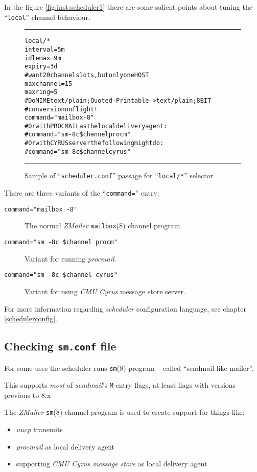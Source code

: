 In the figure \vref{fig:inst:scheduler1} there are some salient
points about tuning the ``{\tt local}'' channel behaviour.

\begin{figure*}
\begin{alltt}\medskip\hrule\medskip
local/*
    interval=5m
    idlemax=9m
    expiry=3d
    # want 20 channel slots, but only one HOST
    maxchannel=15
    maxring=5
    # Do MIME text/plain; Quoted-Printable -> text/plain; 8BIT
    # conversion on flight!
    command="mailbox -8"
    # Or with PROCMAIL as the local delivery agent:
    #command="sm -8c \$channel procm"
    # Or with CYRUS server the following might do:
    #command="sm -8c \$channel cyrus"
\medskip\hrule\medskip\end{alltt}
\caption{\label{fig:inst:scheduler1}Sample of ``{\tt scheduler.conf}'' passage for ``{\tt local/*}'' selector}
\end{figure*}

There are three variants of the ``{\tt command=}'' entry:
\begin{description}
\item[{\tt command="mailbox -8"}] \mbox{}

The normal {\em ZMailer} {\tt mailbox}(8) channel program.

\item[{\tt command="sm -8c \$channel procm"}] \mbox{}

Variant for running {\em procmail}.

\item[{\tt command="sm -8c \$channel cyrus"}] \mbox{}

Variant for using {\em CMU Cyrus} message store server.
\end{description}

For more information regarding {\em scheduler} configuration language,
see chapter \vref{schedulerconfig}.

\subsection{Checking {\tt sm.conf} file}%

For some uses the scheduler runs {\tt sm}(8) program -- called
``sendmail-like mailer''.

This supports {\em most} of {\em sendmail}'s {\tt M}-entry flags,
at least flags with versions previous to 8.x

The {\em ZMailer} {\tt sm}(8) channel program is used to create support
for things like:
\begin{itemize}
\item {\em uucp} transmits
\item {\em procmail} as local delivery agent
\item supporting {\em CMU Cyrus message store} as local delivery agent
\end{itemize}

